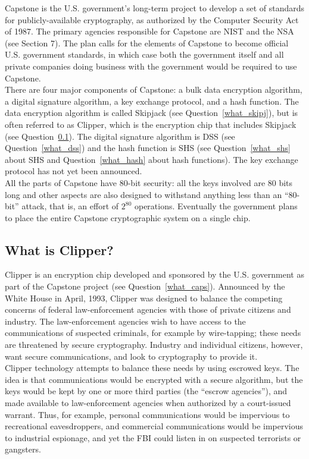 Capstone is the U.S. government's long-term project to develop a set of
standards for publicly-available cryptography, as authorized by the
Computer Security Act of 1987. The primary agencies responsible for
Capstone are NIST and the NSA (see Section 7). The plan calls for the
elements of Capstone to become official U.S. government standards, in
which case both the government itself and all private companies doing
business with the government would be required to use Capstone.\\

There are four major components of Capstone: a bulk data encryption
algorithm, a digital signature algorithm, a key exchange protocol, and a
hash function. The data encryption algorithm is called Skipjack (see
Question~\ref{what_skipj}), but is often referred to as Clipper, which is
the encryption chip that includes Skipjack (see Question~\ref{what_clipp}).
The digital signature algorithm is DSS (see Question~\ref{what_dss}) and
the hash function is SHS (see Question~\ref{what_shs} about SHS and
Question~\ref{what_hash} about hash functions).  The key exchange protocol
has not yet been announced.\\

All the parts of Capstone have 80-bit security: all the keys involved
are 80 bits long and other aspects are also designed to withstand
anything less than an ``80-bit'' attack, that is, an effort of $2^{80}$
operations. Eventually the government plans to place the entire
Capstone cryptographic system on a single chip.

\subsection{What is Clipper?}
\label{what_clipp}

Clipper is an encryption chip developed and sponsored by the U.S.
government as part of the Capstone project (see Question~\ref{what_caps}).
Announced by the White House in April, 1993, Clipper was designed to
balance the competing concerns of federal law-enforcement agencies with
those of private citizens and industry. The law-enforcement agencies wish
to have access to the communications of suspected criminals, for example by
wire-tapping; these needs are threatened by secure cryptography. Industry
and individual citizens, however, want secure communications, and look to
cryptography to provide it.\\

Clipper technology attempts to balance these needs by using escrowed
keys. The idea is that communications would be encrypted with a secure
algorithm, but the keys would be kept by one or more third parties (the
``escrow agencies''), and made available to law-enforcement agencies
when authorized by a court-issued warrant. Thus, for example, personal
communications would be impervious to recreational eavesdroppers, and
commercial communications would be impervious to industrial espionage,
and yet the FBI could listen in on suspected terrorists or gangsters.\\

